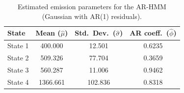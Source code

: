 \begin{table}[ht]
\centering
\begin{tabular}{lccc}
\hline
State & Mean ($\hat{\mu}$) & Std.\ Dev.\ ($\hat{\sigma}$) & AR coeff.\ ($\hat{\phi}$) \\
\hline
State 1 &  400.000 &  12.501 & 0.6235 \\
State 2 &  509.326 &  77.704 & 0.3659 \\
State 3 &  560.287 &  11.006 & 0.9462 \\
State 4 & 1366.661 & 102.836 & 0.8318 \\
\hline
\end{tabular}
\caption{Estimated emission parameters for the AR-HMM (Gaussian with AR(1) residuals).}
\label{tab:ar_hmm_emissions}
\end{table}
